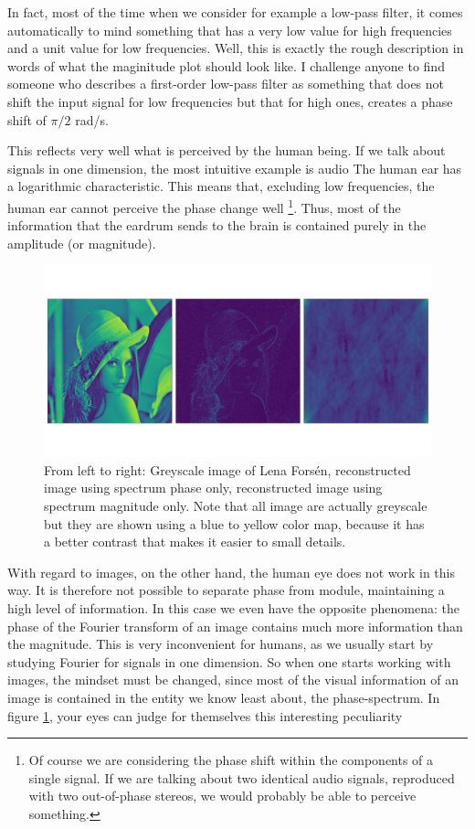 In fact, most of the time when we consider for example a low-pass filter, it
comes automatically to mind something that has a very low value for high
frequencies and a unit value for low frequencies. Well, this is exactly the
rough description in words of what the maginitude plot should look like. I
challenge anyone to find someone who describes a first-order low-pass filter
as something that does not shift the input signal for low frequencies but that
for high ones, creates a phase shift of $\pi/2$ rad/s.

This reflects very well what is perceived by the human being. If we talk about
signals in one dimension, the most intuitive example is audio The human ear
has a logarithmic characteristic. This means that, excluding low frequencies,
the human ear cannot perceive the phase change well \footnote{Of course we are
considering the phase shift within the components of a single signal. If we
are talking about two identical audio signals, reproduced with two
out-of-phase stereos, we would probably be able to perceive something.}. Thus,
most of the information that the eardrum sends to the brain is contained
purely in the amplitude (or magnitude).

\begin{figure}
  \centering
  \includegraphics[width=.95\textwidth, trim=0 100 0 100, clip]{papers/kugel/figures/python/phase_vs_abs.pdf}
  \caption {
    From left to right: Greyscale image of Lena Forsén, reconstructed image
    using spectrum phase only, reconstructed image using spectrum magnitude
    only. Note that all image are actually greyscale but they are shown using
    a blue to yellow color map, because it has a better contrast that makes it
    easier to small details.
    \label{kugel:fig:2d-fourier-phasevsmagn}
  }
\end{figure}

With regard to images, on the other hand, the human eye does not work in this
way. It is therefore not possible to separate phase from module, maintaining a
high level of information. In this case we even have the opposite phenomena:
the phase of the Fourier transform of an image contains much more information
than the magnitude. This is very inconvenient for humans, as we usually start
by studying Fourier for signals in one dimension. So when one starts working
with images, the mindset must be changed, since most of the visual information
of an image is contained in the entity we know least about, the
phase-spectrum. In figure \ref{kugel:fig:2d-fourier-phasevsmagn}, your eyes
can judge for themselves this interesting peculiarity

